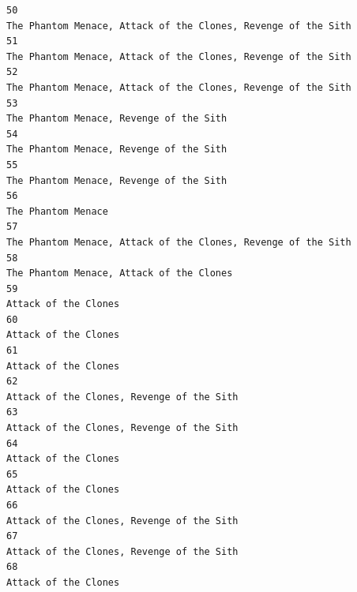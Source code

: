 \documentclass[
]{article}
\begin{document}
\begin{verbatim}
50                                                                             The Phantom Menace, Attack of the Clones, Revenge of the Sith
51                                                                             The Phantom Menace, Attack of the Clones, Revenge of the Sith
52                                                                             The Phantom Menace, Attack of the Clones, Revenge of the Sith
53                                                                                                   The Phantom Menace, Revenge of the Sith
54                                                                                                   The Phantom Menace, Revenge of the Sith
55                                                                                                   The Phantom Menace, Revenge of the Sith
56                                                                                                                        The Phantom Menace
57                                                                             The Phantom Menace, Attack of the Clones, Revenge of the Sith
58                                                                                                  The Phantom Menace, Attack of the Clones
59                                                                                                                      Attack of the Clones
60                                                                                                                      Attack of the Clones
61                                                                                                                      Attack of the Clones
62                                                                                                 Attack of the Clones, Revenge of the Sith
63                                                                                                 Attack of the Clones, Revenge of the Sith
64                                                                                                                      Attack of the Clones
65                                                                                                                      Attack of the Clones
66                                                                                                 Attack of the Clones, Revenge of the Sith
67                                                                                                 Attack of the Clones, Revenge of the Sith
68                                                                                                                      Attack of the Clones

\end{verbatim}
\end{document}
